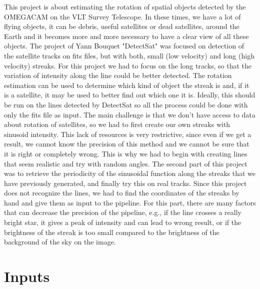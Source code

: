 \documentclass[a4paper,12pt,oneside]{report}
\begin{document}
This project is about estimating the rotation of spatial objects detected by the OMEGACAM on the VLT Survey Telescope. In these times,
we have a lot of flying objects, it can be debris, useful satellites or dead satellites, around the Earth and it becomes more and more
necessary to have a clear view of all these objects.
The project of Yann Bouquet "DetectSat"\cite{detectsatRepository} was focused on detection of the satellite tracks on fits files, but with both,
small (low velocity) and long (high velocity) streaks. For this project we had to focus on the long tracks, so that the variation of intensity
along the line could be better detected. The rotation estimation can be used to determine which kind of object the streak is and, if it is
a satellite, it may be used to better find out which one it is. Ideally, this should be run on the lines detected by DetectSat so all the process
could be done with only the fits file as input.
\newline
\newline
The main challenge is that we don't have access to data about rotation of satellites, so we had to first create our own streaks 
with sinusoid intensity. This lack of resources is very restrictive, since even if we get a result, we cannot know the precision of this method 
and we cannot be sure that it is right or completely wrong. This is why we had to begin with creating lines that seem realistic and
try with random angles.
\newline
\newline
The second part of this project was to retrieve the periodicity of the sinusoidal function along the streaks that we have previously generated, 
and finally try this on real tracks. Since this project does not recognize the lines, we had to find the coordinates of the streaks by hand and give them
as input to the pipeline. For this part, there are many factors that can decrease the precision of the pipeline, e.g., if the line crosses a
really bright star, it gives a peak of intensity and can lead to wrong result, or if the brightness of the streak is too small
compared to the brightness of the background of the sky on the image. 


\chapter{Inputs}
\end{document}
